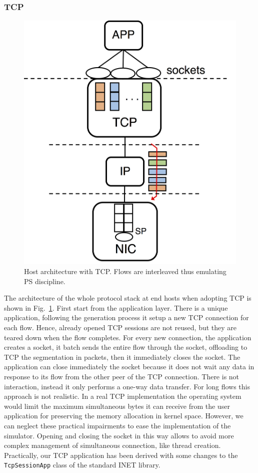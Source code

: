 \subsubsection{TCP}
\begin{figure}[!tb]
	\centering
	\captionsetup{width=.75\linewidth}
	\includegraphics[width=0.4\linewidth]{Chapter4/Figures/tcp-config}
	\caption{Host architecture with TCP. Flows are interleaved thus emulating PS discipline.}
	\label{fig:tcp-config}
\end{figure}%
The architecture of the whole protocol stack at end hosts when adopting TCP is shown in Fig.~\ref{fig:tcp-config}. First start from the application layer. There is a unique application, following the generation process it setup a new TCP connection for each flow. Hence, already opened TCP sessions are not reused, but they are teared down when the flow completes. For every new connection, the application creates a socket, it batch sends the entire flow through the socket, offloading to TCP the segmentation in packets, then it immediately closes the socket. The application can close immediately the socket because it does not wait any data in response to its flow from the other peer of the TCP connection. There is not interaction, instead it only performs a one-way data transfer. For long flows this approach is not realistic. In a real TCP implementation the operating system would limit the maximum simultaneous bytes it can receive from the user application for preserving the memory allocation in kernel space. However, we can neglect these practical impairments to ease the implementation of the simulator. Opening and closing the socket in this way allows to avoid more complex management of simultaneous connection, like thread creation. Practically, our TCP application has been derived with some changes to the \texttt{TcpSessionApp} class of the standard INET library.\\
